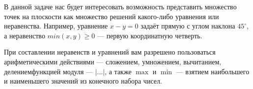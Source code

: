 ﻿

\vspace{-0.2cm} 

\ms В данной задаче нас будет интересовать возможность представить множество точек на плоскости как множество решений какого-либо уравнения или неравенства. Например, уравнение $x - y = 0$ задаёт прямую с углом наклона $45^\circ$, а неравенство $min (x,y) \geq 0$ — первую координатную четверть.

\ms При составлении неравенств и уравнений вам разрешено пользоваться арифметическими действиями — сложением, умножением, вычитанием, делением\scolon функцией модуля — $|\ldots|$, а также $\max$ и $\min$ — взятием наибольшего и наименьшего значений из конечного набора чисел.

